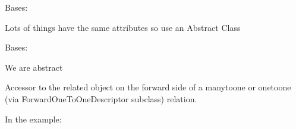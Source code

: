 \documentclass[letterpaper,10pt,english]{sphinxmanual}
\begin{document}
\begin{fulllineitems}
\label{\detokenize{forums:forums.models.AbstractForum}}
Bases: 

Lots of things have the same attributes so use an Abstract Class

\begin{fulllineitems}
\label{\detokenize{forums:forums.models.AbstractForum.Meta}}
Bases: 

We are abstract

\begin{fulllineitems}
\label{\detokenize{forums:forums.models.AbstractForum.Meta.abstract}}
\end{fulllineitems}


\end{fulllineitems}


\begin{fulllineitems}
\label{\detokenize{forums:forums.models.AbstractForum.author}}
Accessor to the related object on the forward side of a many\sphinxhyphen{}to\sphinxhyphen{}one or
one\sphinxhyphen{}to\sphinxhyphen{}one (via ForwardOneToOneDescriptor subclass) relation.

In the example:

\begin{sphinxVerbatim}[commandchars=\\\{\}]
 
       
\end{sphinxVerbatim}


\end{fulllineitems}
\end{fulllineitems}
\end{document}
